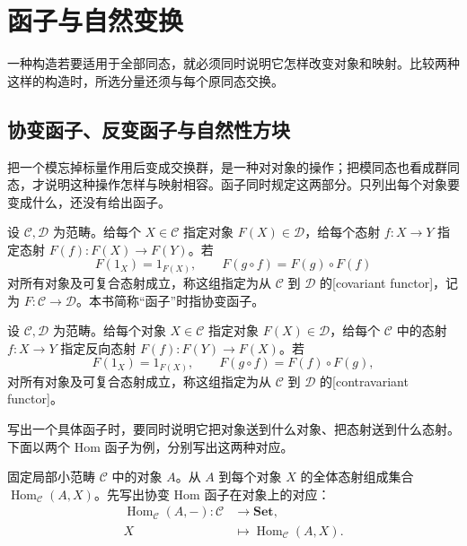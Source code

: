 
\section{函子与自然变换}
\label{b4:sec:0102}

一种构造若要适用于全部同态，就必须同时说明它怎样改变对象和映射。比较两种这样的构造时，所选分量还须与每个原同态交换。

%
%

\subsection{协变函子、反变函子与自然性方块}
\label{b4:subsec:0102:01}

把一个模忘掉标量作用后变成交换群，是一种对对象的操作；把模同态也看成群同态，才说明这种操作怎样与映射相容。函子同时规定这两部分。只列出每个对象要变成什么，还没有给出函子。

\begin{definition}\label{b4:def:functor}
	设 \(\mathcal C,\mathcal D\) 为范畴。给每个 \(X\in\mathcal C\) 指定对象 \(F(X)\in\mathcal D\)，给每个态射 \(f:X\rightarrow Y\) 指定态射 \(F(f):F(X)\rightarrow F(Y)\)。若
	\[
		F(1_X)=1_{F(X)},\qquad F(g\circ f)=F(g)\circ F(f)
	\]
	对所有对象及可复合态射成立，称这组指定为从 \(\mathcal C\) 到 \(\mathcal D\) 的[covariant functor]，记为 \(F:\mathcal C\rightarrow\mathcal D\)。本书简称“函子”时指协变函子。
\end{definition}

\begin{definition}\label{b4:def:contravariant-functor}
	设 \(\mathcal C,\mathcal D\) 为范畴。给每个对象 \(X\in\mathcal C\) 指定对象 \(F(X)\in\mathcal D\)，给每个 \(\mathcal C\) 中的态射 \(f:X\rightarrow Y\) 指定反向态射 \(F(f):F(Y)\rightarrow F(X)\)。若
	\[
		F(1_X)=1_{F(X)},\qquad F(g\circ f)=F(f)\circ F(g),
	\]
	对所有对象及可复合态射成立，称这组指定为从 \(\mathcal C\) 到 \(\mathcal D\) 的[contravariant functor]。
\end{definition}

写出一个具体函子时，要同时说明它把对象送到什么对象、把态射送到什么态射。下面以两个 Hom 函子为例，分别写出这两种对应。

\ProseParagraphBreak
固定局部小范畴 \(\mathcal C\) 中的对象 \(A\)。从 \(A\) 到每个对象 \(X\) 的全体态射组成集合 \(\operatorname{Hom}_{\mathcal C}(A,X)\)。先写出协变 Hom 函子在对象上的对应：
\[
	\begin{aligned}
		\operatorname{Hom}_{\mathcal C}(A,-):\mathcal C&\longrightarrow\mathbf{Set},\\
		X&\longmapsto\operatorname{Hom}_{\mathcal C}(A,X).
	\end{aligned}
\]

